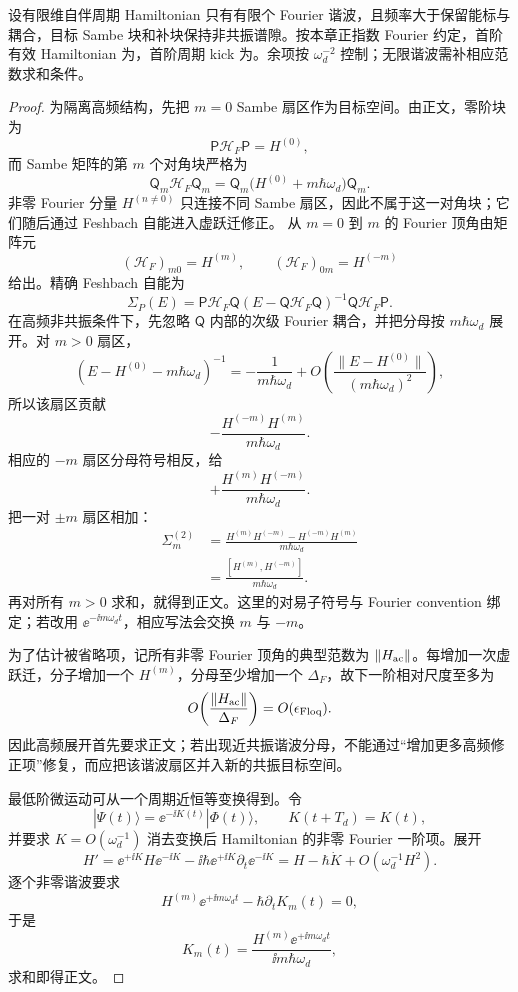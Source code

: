 \begin{proposition}[有限谐波高频展开的首阶与微运动]
设有限维自伴周期 Hamiltonian 只有有限个 Fourier 谐波，且频率大于保留能标与耦合，目标 Sambe 块和补块保持非共振谱隙。按本章正指数 Fourier 约定，首阶有效 Hamiltonian 为，首阶周期 kick 为。余项按 $\omega_d^{-2}$ 控制；无限谐波需补相应范数求和条件。
\end{proposition}
\begin{proof}
为隔离高频结构，先把 $m=0$ Sambe 扇区作为目标空间。由正文，零阶块为
\[
\mathsf P\mathcal H_F\mathsf P=H^{(0)},
\]
而 Sambe 矩阵的第 $m$ 个对角块严格为
\[
\mathsf Q_m\mathcal H_F\mathsf Q_m
=\mathsf Q_m\bigl(H^{(0)}+m\hbar\omega_d\bigr)\mathsf Q_m.
\]
非零 Fourier 分量 $H^{(n\ne0)}$ 只连接不同 Sambe 扇区，因此不属于这一对角块；它们随后通过 Feshbach 自能进入虚跃迁修正。
从 $m=0$ 到 $m$ 的 Fourier 顶角由矩阵元
\[
(\mathcal H_F)_{m0}=H^{(m)},
\qquad
(\mathcal H_F)_{0m}=H^{(-m)}
\]
给出。精确 Feshbach 自能为
\[
\Sigma_P(E)
=\mathsf P\mathcal H_F\mathsf Q
(E-\mathsf Q\mathcal H_F\mathsf Q)^{-1}
\mathsf Q\mathcal H_F\mathsf P.
\]
在高频非共振条件下，先忽略 $\mathsf Q$ 内部的次级 Fourier 耦合，并把分母按 $m\hbar\omega_d$ 展开。对 $m>0$ 扇区，
\[
(E-H^{(0)}-m\hbar\omega_d)^{-1}
=-\frac1{m\hbar\omega_d}
+O\!\left(\frac{\|E-H^{(0)}\|}{(m\hbar\omega_d)^2}\right),
\]
所以该扇区贡献
\[
-\frac{H^{(-m)}H^{(m)}}{m\hbar\omega_d}.
\]
相应的 $-m$ 扇区分母符号相反，给
\[
+\frac{H^{(m)}H^{(-m)}}{m\hbar\omega_d}.
\]
把一对 $\pm m$ 扇区相加：
\begin{align*}
\Sigma_m^{(2)}
&=\frac{H^{(m)}H^{(-m)}-H^{(-m)}H^{(m)}}
{m\hbar\omega_d}\\
&=\frac{[H^{(m)},H^{(-m)}]}
{m\hbar\omega_d}.
\end{align*}
再对所有 $m>0$ 求和，就得到正文。这里的对易子符号与 Fourier convention 绑定；若改用 $\ee^{-\ii m\omega_dt}$，相应写法会交换 $m$ 与 $-m$。

为了估计被省略项，记所有非零 Fourier 顶角的典型范数为 $\|H_{\rm ac}\|$。每增加一次虚跃迁，分子增加一个 $H^{(m)}$，分母至少增加一个 $\Delta_F$，故下一阶相对尺度至多为
\[
O\!\left(\frac{\|H_{\rm ac}\|}{\Delta_F}\right)
=O(\epsilon_{\rm Floq}).
\]
因此高频展开首先要求正文；若出现近共振谐波分母，不能通过“增加更多高频修正项”修复，而应把该谐波扇区并入新的共振目标空间。

最低阶微运动可从一个周期近恒等变换得到。令
\[
|\Psi(t)\rangle=\ee^{-\ii K(t)}|\Phi(t)\rangle,
\qquad K(t+T_d)=K(t),
\]
并要求 $K=O(\omega_d^{-1})$ 消去变换后 Hamiltonian 的非零 Fourier 一阶项。展开
\[
H'=
\ee^{+\ii K}H\ee^{-\ii K}
-\ii\hbar\ee^{+\ii K}\partial_t\ee^{-\ii K}
=H-\hbar\dot K+O(\omega_d^{-1}H^2).
\]
逐个非零谐波要求
\[
H^{(m)}\ee^{+\ii m\omega_dt}
-\hbar\partial_tK_m(t)=0,
\]
于是
\[
K_m(t)=\frac{H^{(m)}\ee^{+\ii m\omega_dt}}
{\ii m\hbar\omega_d},
\]
求和即得正文。
\end{proof}


